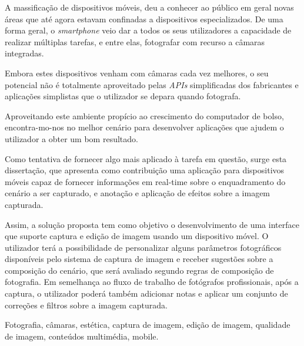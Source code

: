 \abstractPT 

A massificação de dispositivos móveis, deu a conhecer ao público em geral novas áreas que até agora estavam confinadas a dispositivos especializados. De uma forma geral, o \emph{smartphone} veio dar a todos os seus utilizadores a capacidade de realizar múltiplas tarefas, e entre elas, fotografar com recurso a câmaras integradas.


Embora estes dispositivos venham com câmaras cada vez melhores, o seu potencial não é totalmente aproveitado pelas \emph{APIs} simplificadas dos fabricantes e aplicações simplistas que o utilizador se depara quando fotografa.


Aproveitando este ambiente propício ao crescimento do computador de bolso, encontra-mo-nos no melhor cenário para desenvolver aplicações que ajudem o utilizador a obter um bom resultado.


Como tentativa de fornecer algo mais aplicado à tarefa em questão, surge esta dissertação, que apresenta como contribuição uma aplicação para dispositivos móveis capaz de fornecer informações em real-time sobre o enquadramento do cenário a ser capturado, e anotação e aplicação de efeitos sobre a imagem capturada.



Assim, a solução proposta tem como objetivo o desenvolvimento de uma interface que suporte captura e edição de imagem usando um dispositivo móvel. O utilizador terá a possibilidade de personalizar alguns parâmetros fotográficos disponíveis pelo sistema de captura de imagem e receber sugestões sobre a composição do cenário, que será avaliado segundo regras de composição de fotografia. Em semelhança ao fluxo de trabalho de fotógrafos profissionais, após a captura, o utilizador poderá também adicionar notas e aplicar um conjunto de correções e filtros sobre a imagem capturada.

\begin{keywords}
Fotografia, câmaras, estética, captura de imagem, edição de imagem, qualidade de imagem, conteúdos multimédia, mobile.
\end{keywords}
